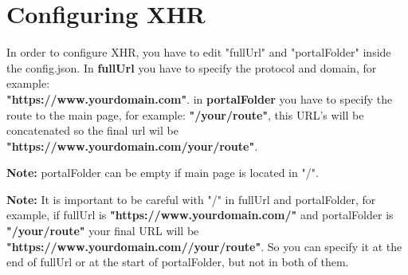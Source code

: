 \documentclass[12pt]{article}
\begin{document}
\section{Configuring XHR}
In order to configure XHR, you have to edit "fullUrl" and "portalFolder" inside the config.json. In \textbf{fullUrl} you have to specify the protocol and domain, for example: \\\textbf{"https://www.yourdomain.com"}. in \textbf{portalFolder} you have to specify the route to the main page, for example: \textbf{"/your/route"}, this URL's will be concatenated so the final url wil be \textbf{"https://www.yourdomain.com/your/route"}.\par
\noindent
\textbf{Note:} portalFolder can be empty if main page is located in "/".\par
\noindent
\textbf{Note:} It is important to be careful with "/" in fullUrl and portalFolder, for example, if fullUrl is \textbf{"https://www.yourdomain.com/"} and portalFolder is \textbf{"/your/route"} your final URL will be \textbf{"https://www.yourdomain.com//your/route"}. So you can specify it at the end of fullUrl or at the start of portalFolder, but not in both of them.	\par
\end{document}
